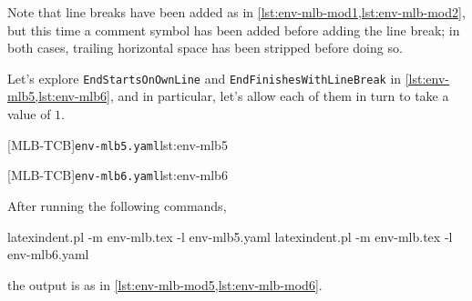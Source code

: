 \begin{sidebyside}
\begin{minipage}{.57\linewidth}
\end{minipage}
\hfill
\begin{minipage}{.42\linewidth}
\end{minipage}
\end{sidebyside}

Note that line breaks have been added as in \cref{lst:env-mlb-mod1,lst:env-mlb-mod2}, but this time a comment symbol
has been added before adding the line break; in both cases, trailing horizontal 
space has been stripped before doing so.

Let's explore \texttt{EndStartsOnOwnLine} and \texttt{EndFinishesWithLineBreak} in \cref{lst:env-mlb5,lst:env-mlb6}, 
and in particular, let's allow each of them in turn to take a value of $1$.

\begin{minipage}{.49\textwidth}
[MLB-TCB]{\texttt{env-mlb5.yaml}}{lst:env-mlb5}
\end{minipage}
\hfill
\begin{minipage}{.49\textwidth}
[MLB-TCB]{\texttt{env-mlb6.yaml}}{lst:env-mlb6}
\end{minipage}

After running the following commands,
\begin{commandshell}
latexindent.pl -m env-mlb.tex -l env-mlb5.yaml
latexindent.pl -m env-mlb.tex -l env-mlb6.yaml
\end{commandshell}
the output is as in \cref{lst:env-mlb-mod5,lst:env-mlb-mod6}.

\begin{sidebyside}
\begin{minipage}{.42\linewidth}
\end{minipage}
\hfill
\begin{minipage}{.57\linewidth}
\end{minipage}
\end{sidebyside}

